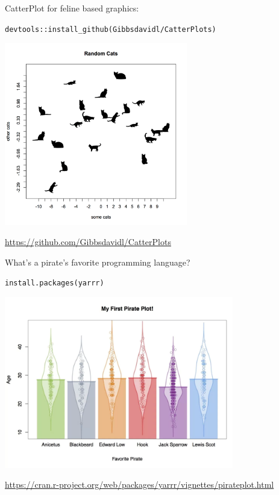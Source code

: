 \documentclass[
  ignorenonframetext,
]{beamer}
\begin{document}
\begin{frame}[fragile]{CatterPlot for feline based graphics:}
\protect\hypertarget{catterplot-for-feline-based-graphics}{}

\texttt{devtools::install\_github(Gibbsdavidl/CatterPlots)}

\includegraphics[width=0.6\textwidth,height=\textheight]{../external/images/funR_1_catterplotter.png}

\url{https://github.com/Gibbsdavidl/CatterPlots}

\end{frame}

\begin{frame}[fragile]{What's a pirate's favorite programming language?}
\protect\hypertarget{whats-a-pirates-favorite-programming-language}{}

\texttt{install.packages(\textquotesingle{}yarrr\textquotesingle{})}

\includegraphics[width=0.75\textwidth,height=\textheight]{../external/images/funR_2_pirate.png}

\url{https://cran.r-project.org/web/packages/yarrr/vignettes/pirateplot.html}

\end{frame}
\end{document}
